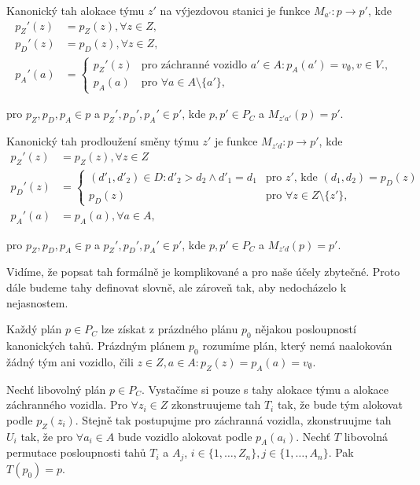 \begin{definice}
  Kanonický tah alokace týmu $z'$ na výjezdovou stanici je funkce $M_{a'} : p \rightarrow p'$, kde
  \begin{align*}
    p_Z'(z) &= p_Z(z), \forall z \in Z,
    \\
    p_D'(z) &= p_D(z), \forall z \in Z,
    \\
    p_A'(a) &=
    \begin{cases}
      p_Z'(z) & \text{pro záchranné vozidlo $a' \in A \colon p_A(a') = v_{\emptyset}, v \in V$.}, \\
      p_A(a) & \text{pro $\forall a \in A \setminus \{ a' \}$},
    \end{cases}
  \end{align*}

  pro $p_Z, p_D, p_A \in p$ a $p_Z', p_D', p_A' \in p'$, kde $p, p' \in P_C$ a $M_{z'a'}(p) = p'$.

  Kanonický tah prodloužení směny týmu $z'$ je funkce $M_{z'd} : p \rightarrow p'$, kde
  \begin{align*}
    p_Z'(z) &= p_Z(z), \forall z \in Z \\
    p_D'(z) &=
      \begin{cases}
        (d'_1, d'_2) \in D \colon d'_2 > d_2 \land d'_1 = d_1  & \text{pro $z'$, kde $(d_1, d_2) = p_{D}(z)$} \\
        p_D(z) & \text{pro $\forall z \in Z \setminus \{ z' \}$},
      \end{cases}
      \\
    p_A'(a) &= p_A(a), \forall a \in A,
  \end{align*}

  pro $p_Z, p_D, p_A \in p$ a $p_Z', p_D', p_A' \in p'$, kde $p, p' \in P_C$ a $M_{z'd}(p) = p'$.
\end{definice}

Vidíme, že popsat tah formálně je komplikované a pro naše účely zbytečné.
Proto dále budeme tahy definovat slovně, ale zároveň tak, aby nedocházelo k nejasnostem.

\begin{veta}\label{veta:vztahMeziPlanyAKan}
  Každý plán $p \in P_C$ lze získat z prázdného plánu $p_0$ nějakou posloupností kanonických tahů.
  Prázdným plánem $p_0$ rozumíme plán, který nemá naalokován žádný tým ani vozidlo, čili $z \in Z, a \in A \colon p_Z(z) = p_A(a) = v_{\emptyset}$.
\end{veta}
\begin{dukaz}
  Nechť libovolný plán $p \in P_C$.
  Vystačíme si pouze s tahy alokace týmu a alokace záchranného vozidla.
  Pro $\forall z_i \in Z$ zkonstruujeme tah $T_i$ tak, že bude tým alokovat podle $p_Z(z_i)$.
  Stejně tak postupujme pro záchranná vozidla, zkonstruujme tah $U_i$ tak, že pro $\forall a_i \in A$ bude vozidlo alokovat podle $p_A(a_i)$.
  Nechť $T$ libovolná permutace posloupnosti tahů $T_i$ a $A_j$, $i \in \{ 1, \dots , Z_n\}, j \in \{ 1, \dots , A_n \}$.
  Pak $T(p_0) = p$.
\end{dukaz}

